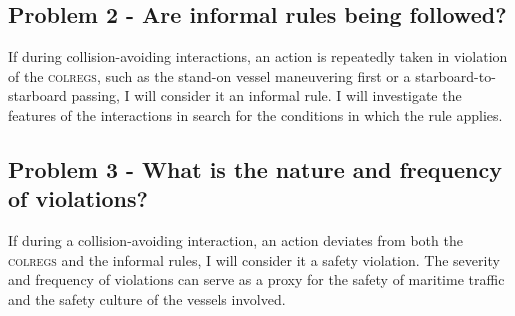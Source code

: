 \documentclass[twoside,symmetric,notoc]{tufte-book}
\begin{document}
\subsection*{Problem 2 - Are informal rules being followed?}
\par{If during collision-avoiding interactions, an action is repeatedly taken in violation of the \textsc{colregs}, such as the stand-on vessel maneuvering first or a starboard-to-starboard passing, I will consider it an informal rule. I will investigate the features of the interactions in search for the conditions in which the rule applies.
}
\subsection*{Problem 3 - What is the nature and frequency of violations?}
\par{If during a collision-avoiding interaction, an action deviates from both the \textsc{colregs} and the informal rules, I will consider it a safety violation. The severity and frequency of violations can serve as a proxy for the safety of maritime traffic and the safety culture of the vessels involved.
}
\end{document}
